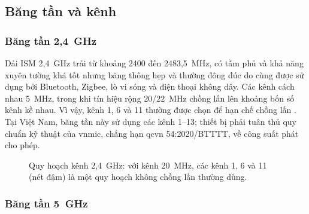 \subsection{Băng tần và kênh}

\subsubsection{Băng tần 2,4~GHz}

Dải ISM 2,4~GHz trải từ khoảng 2400 đến 2483,5~MHz, có tầm phủ và khả năng
xuyên tường khá tốt nhưng băng thông hẹp và thường đông đúc do cùng được sử
dụng bởi Bluetooth, Zigbee, lò vi sóng và điện thoại không dây. Các kênh cách
nhau 5~MHz, trong khi tín hiệu rộng 20/22~MHz chồng lấn lên khoảng bốn số kênh
kề nhau. Vì vậy, kênh 1, 6 và 11 thường được chọn để hạn chế chồng lấn \cite{cisco_rf_guide}. Tại
Việt Nam, băng tần này sử dụng các kênh 1--13; thiết bị phải tuân thủ quy chuẩn
kỹ thuật của \ac{vnmic}, chẳng hạn \acs{qcvn} 54:2020/BTTTT, về công suất phát
cho phép.

\begin{figure}[htbp]
  \centering
  \caption{Quy hoạch kênh 2,4~GHz: với kênh 20~MHz, các kênh 1, 6 và 11
  (nét đậm) là một quy hoạch không chồng lấn thường dùng.}
  \label{fig:ch24}
\end{figure}

\subsubsection{Băng tần 5~GHz}

